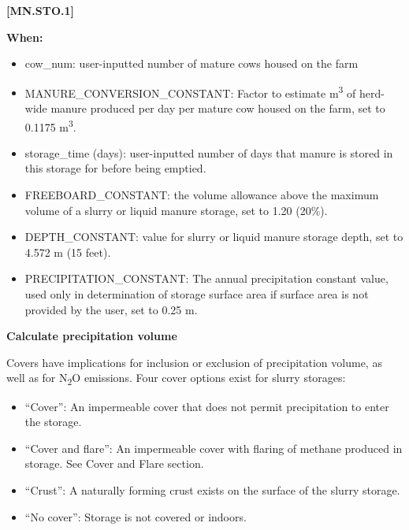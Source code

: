 \begin{refsection}
            {\raggedleft \textbf{[MN.STO.1]}\par}
            \vspace{0.5cm}

    \textbf{When:}

    \begin{itemize}
        \item cow\_num: user-inputted number of mature cows housed on the farm
        \item MANURE\_CONVERSION\_CONSTANT: Factor to estimate  m\textsuperscript{3} of herd-wide manure produced per day per mature cow housed on the farm, set to 0.1175  m\textsuperscript{3}.
        \item storage\_time (days): user-inputted number of days that manure is stored in this storage for before being emptied.
        \item FREEBOARD\_CONSTANT: the volume allowance above the maximum volume of a slurry or liquid manure storage, set to 1.20 (20\%).
        \item DEPTH\_CONSTANT: value for slurry or liquid manure storage depth, set to 4.572 m (15 feet). 
        \item PRECIPITATION\_CONSTANT: The annual precipitation constant value, used only in determination of storage surface area if surface area is not provided by the user, set to 0.25 m.

    \end{itemize}
    \vspace{0.5cm}


\textbf{Calculate precipitation volume}
\vspace{0.2cm}

Covers have implications for inclusion or exclusion of precipitation volume, as well as for N\textsubscript{2}O emissions. Four cover options exist for slurry storages: 

    \begin{itemize}
        \item “Cover”: An impermeable cover that does not permit precipitation to enter the storage.
        \item “Cover and flare”: An impermeable cover with flaring of methane produced in storage. See Cover and Flare section. 
        \item “Crust”: A naturally forming crust exists on the surface of the slurry storage.
        \item “No cover”: Storage is not covered or indoors.
    \end{itemize}
    \vspace{0.5cm}


\end{refsection}
